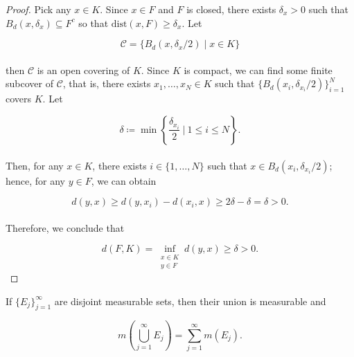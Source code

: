 \documentclass[12pt, a4paper, openany, twoside]{book}
\theoremstyle{definition}
\theoremstyle{remark}
\theoremstyle{plain}
\numberwithin{equation}{section}
\begin{document}
\vspace{5mm}
\begin{proof}
    Pick any $x\in K$. Since $x\in F$ and $F$ is closed, there exists $\delta_x>0$ such that $B_d(x,\delta_x)\subseteq F^c$ so that $\mathrm{dist}(x,F)\geq\delta_x$. Let 

    \[\mathcal{C}=\big\{B_d\left(x,\delta_x/2\right)\mid x\in K\big\}\]
    \\
    then $\mathcal{C}$ is an open covering of $K$. Since $K$ is compact, we can find some finite subcover of $\mathcal{C}$, that is, there exists $x_1,\dots, x_N\in K$ such that $\{B_d(x_i,\delta_{x_i}/2)\}_{i=1}^{N}$ covers $K$. Let 

    \[\delta\coloneqq\min\left\{\frac{\delta_{x_i}}{2}\ \Big|\ 1\leq i\leq N\right\}.\]
    \\
    Then, for any $x\in K$, there exists $i\in\{1,\dots,N\}$ such that $x\in B_d(x_i, \delta_{x_i}/2)$; hence, for any $y\in F$, we can obtain

    \[d(y,x)\geq d(y,x_i)-d(x_i,x)\geq 2\delta-\delta=\delta>0.\]
    \\
    Therefore, we conclude that 

    \[d(F,K)=\inf_{\substack{x\in K\\ y\in F}}{d(y,x)}\geq\delta>0.\]
\end{proof}
\vspace{5mm}
\begin{tcolorbox}[colback=yellow!10!white,colframe=red!75!black,title=Theorem 1.3.3]\label{Theorem 1.3.3}
    If $\{E_j\}_{j=1}^{\infty}$ are disjoint measurable sets, then their union is measurable and

    \[m\left(\bigcup_{j=1}^{\infty}{E_j}\right)=\sum_{j=1}^{\infty}{m(E_j)}.\]
\end{tcolorbox}
\end{document}

